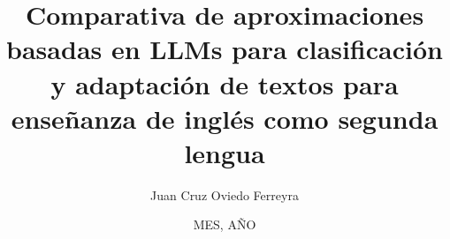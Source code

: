 \documentclass[a4paper,12pt]{article}
\title{Comparativa de aproximaciones basadas en LLMs para clasificación y adaptación de textos para enseñanza de inglés como segunda lengua}
\author{Juan Cruz Oviedo Ferreyra}
\date{MES, AÑO} %
\begin{document}

\maketitle






\clearpage


\clearpage


\tableofcontents  

\clearpage














\printbibliography[heading=bibintoc]

\begin{appendices}
  
  
  
    
\end{appendices}
\end{document}
